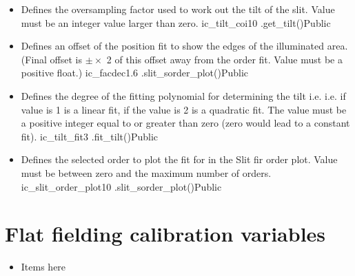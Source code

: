 \begin{itemize}

\item {}
{Defines the oversampling factor used to work out the tilt of the slit. Value must be an integer value larger than zero.}
{ic\_tilt\_coi}{10}
{\calSLIT}{\constantsfile}{\spirouImage.get\_tilt()}{Public}


\item {}
{Defines an offset of the position fit to show the edges of the illuminated area. (Final offset is $\pm \times$ 2 of this offset away from the order fit. Value must be a positive float.)}
{ic\_facdec}{1.6}
{\calSLIT}{\constantsfile}{\spirouPlot.slit\_sorder\_plot()}{Public}


\item {}
{Defines the degree of the fitting polynomial for determining the tilt i.e. i.e. if value is 1 is a linear fit, if the value is 2 is a quadratic fit.  The value must be a positive integer equal to or greater than zero (zero would lead to a constant fit).}
{ic\_tilt\_fit}{3}
{\calSLIT}{\constantsfile}{\spirouImage.fit\_tilt()}{Public}


\item {}
{Defines the selected order to plot the fit for in the Slit fir order plot. Value must be between zero and the maximum number of orders.}
{ic\_slit\_order\_plot}{10}
{\calSLIT}{\constantsfile}{\spirouPlot.slit\_sorder\_plot()}{Public}


\end{itemize}


\clearpage
\newpage
\section{Flat fielding calibration variables}
\label{ch:variables:flatfielding}

\begin{itemize}

\item Items here
% 


\end{itemize}


